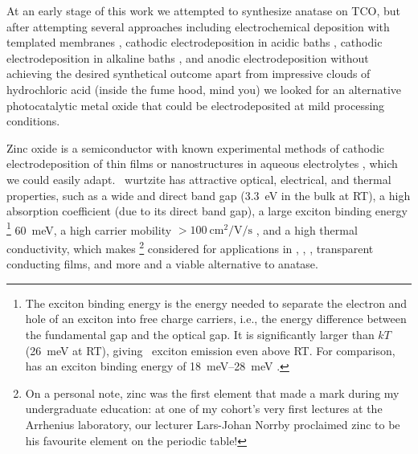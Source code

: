 \documentclass[draft,webedition,openright,titles,swedish,english]{LuaUUThesis}\usepackage[]{graphicx}\usepackage[]{xcolor}
\newcommand{\ie}{i.e.}
\begin{document}
At an early stage of this work we attempted to synthesize anatase 
 on \gls{TCO}, but after attempting several approaches
including
electrochemical deposition with templated membranes
\cite{Limmer2001,Limmer2002,Chu2003,Chu2003b,Limmer2003a,
Limmer2004,Chu2004,Limmer2005,Yan2006},
cathodic electrodeposition in acidic baths
\cite{Natarajan1996,Karuppuchamy2001,Chenthamarakshan2002,Karuppuchamy2002,
deTacconi2003,deTacconi2004,deTacconi2005,Karuppuchamy2005,Karuppuchamy2006,
Karuppuchamy2006a,Somasundaram2006,Karuppuchamy2007,Chettah2008,Chigane2009,
Zhou2009,Chen2010h,Elhajj2010},
cathodic electrodeposition in alkaline baths
\cite{Ohya2002,Sawatani2005,Wessels2008,Wessels2008a}, and
anodic electrodeposition
\cite{Flood1995,Lokhande2005,Wessels2006,Tsai2009,Wu2009b,Wessels2010,Wu2011}
without achieving the desired synthetical outcome apart from
impressive clouds of hydrochloric acid (inside the fume hood, mind you) we looked
for an alternative photocatalytic metal oxide that could be electrodeposited
at mild processing conditions.

Zinc oxide is a semiconductor with known experimental methods of cathodic electrodeposition
of thin films or nanostructures in aqueous electrolytes \cite{Peulon1998,Pauporte2009},
which we could easily adapt.
\ZnO\ wurtzite has attractive optical, electrical, and thermal properties, such as
a wide and direct band gap (\qty{3.3}{\eV} in the bulk at \gls{RT}),
a high absorption coefficient (due to its direct band gap),
a large exciton binding energy%
\footnote{%
   The exciton binding energy is the energy needed to separate the electron and hole
   of an exciton into free charge carriers, \ie, the energy difference between the
   fundamental gap and the optical gap.
   It is significantly larger than $kT$ (\qty{26}{\milli\eV} at \gls{RT}), giving
   \ZnO\ exciton emission even above \gls{RT}.
   For comparison,  has an exciton binding energy of \qtyrange{18}{28}{\meV} \cite{Karpina2004}.
   }
\qty{60}{\milli\eV},
a high carrier mobility $>\qty{100}{\cm\squared\per\volt\per\second}$ \cite{Janotti2009},
and a high thermal conductivity,
which makes \ZnO%
\footnote{%
   On a personal note, zinc was the first element that made a mark
   during my undergraduate education: at one of my cohort's very
   first lectures at the Arrhenius laboratory, our lecturer
   Lars-Johan Norrby proclaimed zinc to be his favourite element on the periodic table!}
considered for applications in ,
, , transparent conducting films, and more
and a viable alternative to  anatase.
\end{document}
